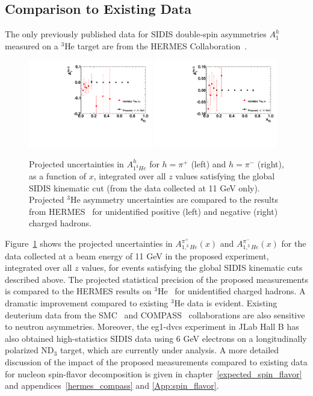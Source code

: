 \subsection{Comparison to Existing Data}
The only previously published data for SIDIS double-spin asymmetries $A_{1}^h$ measured on a $^3$He target are from the HERMES Collaboration~\cite{Ackerstaff:1999ey}. 
\begin{figure}[h]
  \begin{center}
    \includegraphics[width=0.48\textwidth]{figures/A1He3hplus_HERMES_compare.pdf}
    \includegraphics[width=0.48\textwidth]{figures/A1He3hminus_HERMES_compare.pdf}
  \end{center}
  \caption{\label{fig:A1heliumHERMEScomparison} Projected uncertainties in $A^{h}_{1^3He}$ for $h = \pi^+$ (left) and $h = \pi^-$ (right), as a function of $x$, integrated over all $z$ values satisfying the global SIDIS kinematic cut (from the data collected at 11 GeV only). Projected $^3$He asymmetry uncertainties are compared to the results from HERMES~\cite{Ackerstaff:1999ey} for unidentified positive (left) and negative (right) charged hadrons. }
\end{figure}
Figure~\ref{fig:A1heliumHERMEScomparison} shows the projected uncertainties in $A_{1,^3He}^{\pi^+}(x)$ and $A_{1,^3He}^{\pi^-}(x)$ for the data collected at a beam energy of 11 GeV in the proposed experiment, integrated over all $z$ values, for events satisfying the global SIDIS kinematic cuts described above. The projected statistical precision of the proposed measurements is compared to the HERMES results on $^3$He~\cite{Ackerstaff:1999ey} for unidentified charged hadrons. A dramatic improvement compared to existing $^3$He data is evident. Existing deuterium data from the SMC~\cite{Adeva:1997qz} and COMPASS~\cite{Alekseev:2007vi,COMPASS_d_2009,Alekseev:2010ub} collaborations are also sensitive to neutron asymmetries. Moreover, the eg1-dvcs experiment in JLab Hall B has also obtained high-statistics SIDIS data using 6 GeV electrons on a longitudinally polarized ND$_3$ target, which are currently under analysis. A more detailed discussion of the impact of the proposed measurements compared to existing data for nucleon spin-flavor decomposition is given in chapter~\ref{expected_spin_flavor} and appendices~\ref{hermes_compass} and \ref{App:spin_flavor}.

